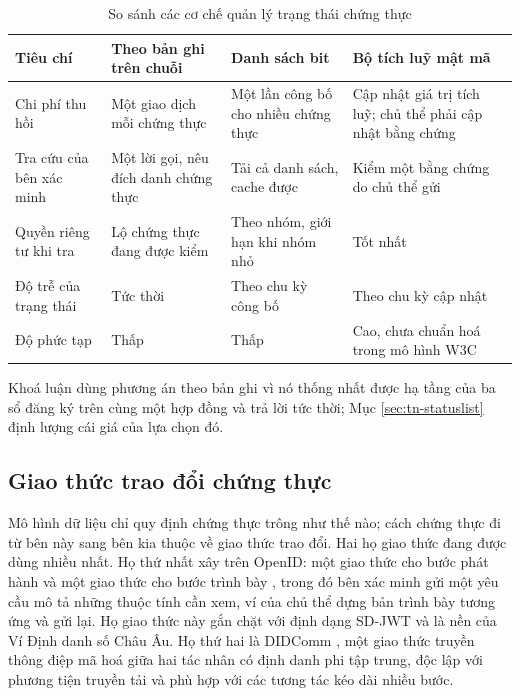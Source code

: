 \begin{table}[H]
\centering
\caption{So sánh các cơ chế quản lý trạng thái chứng thực}
\label{tab:v2-status}
\renewcommand{\arraystretch}{1.2}
\small
\begin{tabular}{|p{2.6cm}|p{3.4cm}|p{3.4cm}|p{3.6cm}|}
\hline
\textbf{Tiêu chí} & \textbf{Theo bản ghi trên chuỗi} & \textbf{Danh sách bit} & \textbf{Bộ tích luỹ mật mã} \\ \hline
Chi phí thu hồi & Một giao dịch mỗi chứng thực & Một lần công bố cho nhiều chứng thực & Cập nhật giá trị tích luỹ; chủ thể phải cập nhật bằng chứng \\ \hline
Tra cứu của bên xác minh & Một lời gọi, nêu đích danh chứng thực & Tải cả danh sách, cache được & Kiểm một bằng chứng do chủ thể gửi \\ \hline
Quyền riêng tư khi tra & Lộ chứng thực đang được kiểm & Theo nhóm, giới hạn khi nhóm nhỏ & Tốt nhất \\ \hline
Độ trễ của trạng thái & Tức thời & Theo chu kỳ công bố & Theo chu kỳ cập nhật \\ \hline
Độ phức tạp & Thấp & Thấp & Cao, chưa chuẩn hoá trong mô hình W3C \\ \hline
\end{tabular}
\end{table}

Khoá luận dùng phương án theo bản ghi vì nó thống nhất được hạ tầng của ba sổ đăng ký trên cùng một hợp đồng và trả lời tức thời; Mục \ref{sec:tn-statuslist} định lượng cái giá của lựa chọn đó.

\subsection{Giao thức trao đổi chứng thực}

Mô hình dữ liệu chỉ quy định chứng thực trông như thế nào; cách chứng thực đi từ bên này sang bên kia thuộc về giao thức trao đổi. Hai họ giao thức đang được dùng nhiều nhất. Họ thứ nhất xây trên OpenID: một giao thức cho bước phát hành và một giao thức cho bước trình bày \cite{OpenID4VP2025}, trong đó bên xác minh gửi một yêu cầu mô tả những thuộc tính cần xem, ví của chủ thể dựng bản trình bày tương ứng và gửi lại. Họ giao thức này gắn chặt với định dạng SD-JWT \cite{SDJWTVC2025} và là nền của Ví Định danh số Châu Âu. Họ thứ hai là DIDComm \cite{DIDComm2021}, một giao thức truyền thông điệp mã hoá giữa hai tác nhân có định danh phi tập trung, độc lập với phương tiện truyền tải và phù hợp với các tương tác kéo dài nhiều bước.

